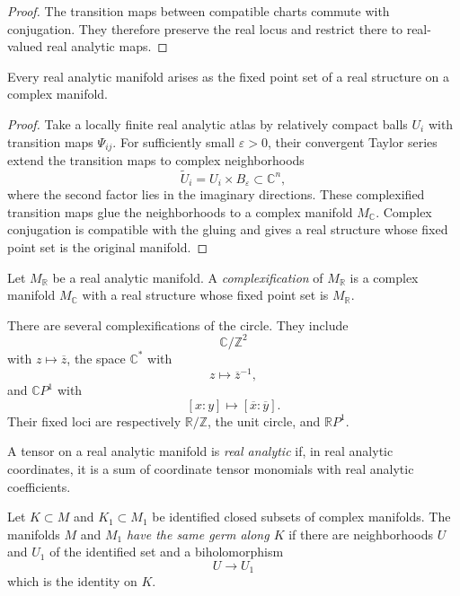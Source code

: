 \begin{proof}
The transition maps between compatible
charts commute with conjugation. They
therefore preserve the real locus and
restrict there to real-valued real analytic
maps.
\end{proof}

\begin{proposition}
\label{proposition-all-real-fixed-loci}
Every real analytic manifold arises as the
fixed point set of a real structure on a
complex manifold.
\end{proposition}

\begin{proof}
Take a locally finite real analytic atlas by
relatively compact balls $U_i$ with
transition maps $\Psi_{ij}$. For sufficiently
small $\varepsilon>0$, their convergent
Taylor series extend the transition maps to
complex neighborhoods
$$
\widetilde{U}_i
=U_i\times B_\varepsilon
\subset\mathbb{C}^n,
$$
where the second factor lies in the
imaginary directions. These complexified
transition maps glue the neighborhoods to a
complex manifold $M_{\mathbb{C}}$. Complex
conjugation is compatible with the gluing
and gives a real structure whose fixed point
set is the original manifold.
\end{proof}

\begin{definition}
\label{definition-complexification}
Let $M_{\mathbb{R}}$ be a real analytic
manifold. A {\it complexification} of
$M_{\mathbb{R}}$ is a complex manifold
$M_{\mathbb{C}}$ with a real structure whose
fixed point set is $M_{\mathbb{R}}$.
\end{definition}

There are several complexifications of the
circle. They include
$$
\mathbb{C}/\mathbb{Z}^2
$$
with $z\mapsto\overline z$, the space
$\mathbb{C}^*$ with
$$
z\longmapsto\overline z^{-1},
$$
and $\mathbb{C}P^1$ with
$$
[x:y]\longmapsto
[\overline{x}:\overline{y}].
$$
Their fixed loci are respectively
$\mathbb{R}/\mathbb{Z}$, the unit circle,
and $\mathbb{R}P^1$.

\begin{definition}
\label{definition-real-analytic-tensor}
A tensor on a real analytic manifold is
{\it real analytic} if, in real analytic
coordinates, it is a sum of coordinate
tensor monomials with real analytic
coefficients.
\end{definition}

\begin{definition}
\label{definition-same-germ}
Let $K\subset M$ and $K_1\subset M_1$ be
identified closed subsets of complex
manifolds. The manifolds $M$ and $M_1$
{\it have the same germ along $K$} if there
are neighborhoods $U$ and $U_1$ of the
identified set and a biholomorphism
$$
U\longrightarrow U_1
$$
which is the identity on $K$.
\end{definition}

